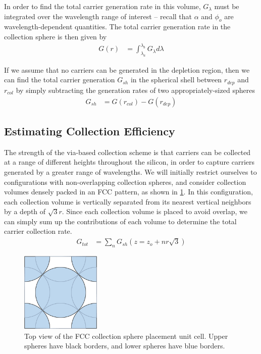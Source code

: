 \documentclass[journal,twoside]{IEEEtran}
\begin{document}
In order to find the total carrier generation rate in this volume, $G_\lambda$ must be integrated over the wavelength range of interest --
recall that $\alpha$ and $\phi_o$ are wavelength-dependent quantities. The total carrier generation rate in the collection sphere is
then given by
\begin{align}
	G(r) &= \int_{\lambda_a}^{\lambda_b} G_\lambda d\lambda
\end{align}

If we assume that no carriers can be generated in the depletion region, then we can find the total carrier generation $G_{sh}$ in the spherical
shell between $r_{dep}$ and $r_{col}$ by simply subtracting the generation rates of two appropriately-sized spheres
\begin{align}
	G_{sh} &= G(r_{col}) - G(r_{dep})	\label{eq-generation-rate-shell}
\end{align}

\subsection{Estimating Collection Efficiency}
The strength of the via-based collection scheme is that carriers can be collected at a range of different heights
throughout the silicon, in order to capture carriers generated by a greater range of wavelengths. We will initially restrict
ourselves to configurations with non-overlapping collection spheres, and consider collection
volumes densely packed in an FCC pattern, as shown in \cref{f-collection-volume-stack}. In this configuration, each collection volume
is vertically separated from its nearest vertical neighbors by a depth of $\sqrt{3}r$. Since each collection volume is placed
to avoid overlap, we can simply sum up the contributions of each volume to determine the total carrier collection rate.
\begin{align}
	G_{tot} &= \sum_n G_{sh}(z=z_o + nr\sqrt{3})	\label{eq-generation-rate-unit-cell}
\end{align}

\begin{figure}[tb]
	\centering
	\includegraphics[width=1.5in]{figures/fcc_top_view.png}
	\caption{	Top view of the FCC collection sphere placement unit cell. Upper spheres have black borders,
				and lower spheres have blue borders.}
	\label{f-collection-volume-stack}
\end{figure}
\end{document}
